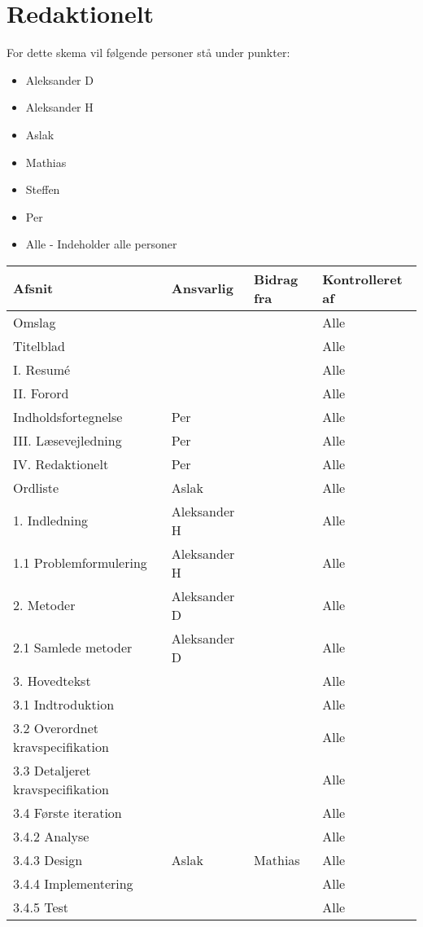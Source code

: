 \chapter{Redaktionelt}
For dette skema vil følgende personer stå under punkter: 
\begin{itemize}
\item Aleksander D
\item Aleksander H
\item Aslak
\item Mathias
\item Steffen
\item Per
\item Alle - Indeholder alle personer 
\end{itemize}

\begin{center}
\begin{longtable}{|m{5.8cm}|m{3.5cm}|m{3.5cm}|m{3.2cm}|}
\hline
\textbf{Afsnit} & \textbf{Ansvarlig} & \textbf{Bidrag fra} & \textbf{Kontrolleret af} \\
\hline
Omslag & & & Alle\\
\hline
Titelblad & & & Alle\\
\hline
I. Resumé & & & Alle\\ \hline
II. Forord & & & Alle\\ \hline
Indholdsfortegnelse & Per & & Alle\\ \hline
III. Læsevejledning & Per & & Alle\\ \hline

IV. Redaktionelt & Per & & Alle\\ \hline
Ordliste & Aslak & & Alle\\ \hline

1. Indledning & Aleksander H & & Alle\\ \hline
1.1 Problemformulering & Aleksander H & & Alle\\ \hline

2. Metoder & Aleksander D & & Alle\\ \hline
2.1 Samlede metoder & Aleksander D & & Alle\\ \hline

3. Hovedtekst & & & Alle\\ \hline
3.1 Indtroduktion & & & Alle\\ \hline
3.2 Overordnet kravspecifikation & & & Alle\\ \hline
3.3 Detaljeret kravspecifikation & & & Alle\\ \hline

3.4 Første iteration & & & Alle\\ \hline
3.4.2 Analyse & & & Alle\\ \hline
3.4.3 Design & Aslak & Mathias & Alle\\ \hline
3.4.4 Implementering & & & Alle\\ \hline
3.4.5 Test & & & Alle\\ \hline


\end{longtable}
\end{center}
